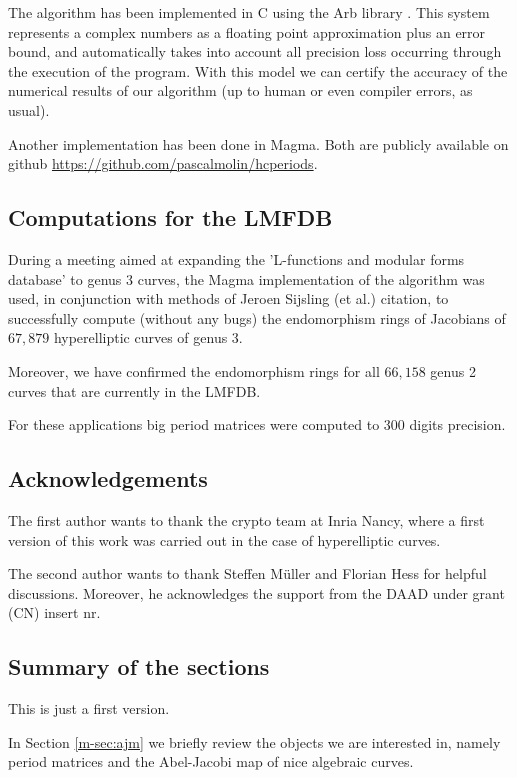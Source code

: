 \documentclass[main.tex]{subfiles}
\begin{document}
  The algorithm has been implemented in C using the Arb library \cite{Johansson2013arb}.
  This system represents a complex numbers as a floating point approximation
  plus an error bound, and automatically
  takes into account all precision loss occurring through the
  execution of the program. With this model we can certify
  the accuracy of the numerical results of our algorithm (up to human or even
  compiler errors, as usual).

  Another implementation has been done in Magma. Both are publicly available
  on github \url{https://github.com/pascalmolin/hcperiods}.

  
  \subsection{Computations for the LMFDB}
    
    During a meeting aimed at expanding the 'L-functions and modular forms database' \cite[LMFDB]{lmfdb} to genus $3$ curves, 
  the Magma implementation of the algorithm was used, in conjunction with methods of Jeroen Sijsling (et al.) \todo citation, to successfully compute (without any bugs)
  the endomorphism rings of Jacobians of $67,879$ hyperelliptic curves of genus $3$.
  
  Moreover, we have confirmed the endomorphism rings for all $66,158$ genus 2 curves that are currently in the LMFDB.
 
  For these applications big period matrices were computed to $300$ digits precision.
  
  \subsection{Acknowledgements}

  The first author wants to thank the crypto team at Inria Nancy, where
  a first version of this work was carried out in the case of hyperelliptic
  curves.
  
  The second author wants to thank Steffen Müller and Florian Hess for helpful discussions. Moreover, he acknowledges the support from the DAAD under grant \todo (CN) insert nr.
 
   
  \subsection{Summary of the sections}
  
  \todo This is just a first version.
  
  In Section \ref{m-sec:ajm} we briefly review the objects we are interested in, namely period matrices and the Abel-Jacobi map of nice algebraic curves.
  
\end{document}
